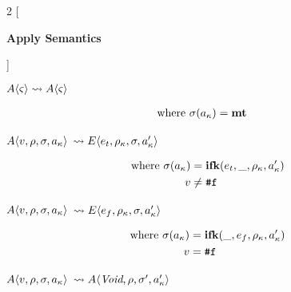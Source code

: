 \documentclass[12pt,draft]{article}
\newcommand{\falsesyn}{\texttt{\#f}}
\newcommand{\E}[4]{E\langle #1 , #2 , #3 , #4 \rangle}
\newcommand{\A}[4]{A\langle #1 , #2 , #3 , #4 \rangle}
\begin{document}
\newpage

\begin{multicols*}{2}
  [
  \begin{center}
    \textbf{Apply Semantics} \\
  \end{center}
  ]
  \begin{center}
    $ A\langle \varsigma \rangle \leadsto A\langle \varsigma \rangle $
  \end{center}
  \vspace{-7mm}
  \begin{align*}
    \text{where }
    \sigma(a_{\kappa}) &= \textbf{mt}
  \end{align*}
  \begin{center}
    $\A{v}{\cenv}{\cstore}{\ckaddr}$
    $\leadsto \E{e_t}{\cenv_\ckont}{\cstore}{\ckaddr'}$
  \end{center}
  \vspace{-7mm}
  \begin{align*}
    \text{where }
    \cstore(\ckaddr) &= \textbf{ifk}(e_t , \_ , \cenv_{\ckont} , \ckaddr') \\
    v &\not= \falsesyn
  \end{align*}
  \begin{center}
    $\A{v}{\cenv}{\cstore}{\ckaddr}$
    $\leadsto \E{e_f}{\cenv_\ckont}{\cstore}{\ckaddr'}$
  \end{center}
  \vspace{-7mm}
  \begin{align*}
    \text{where }
    \cstore(\ckaddr) &= \textbf{ifk}(\_ , e_f , \cenv_{\ckont} , \ckaddr') \\
    v &= \falsesyn
  \end{align*}
  \begin{center}
    $\A{v}{\cenv}{\cstore}{\ckaddr}$
    $\leadsto \A{\textit{Void}}{\cenv}{\cstore'}{\ckaddr'}$

\end{center}
\end{multicols*}
\end{document}
